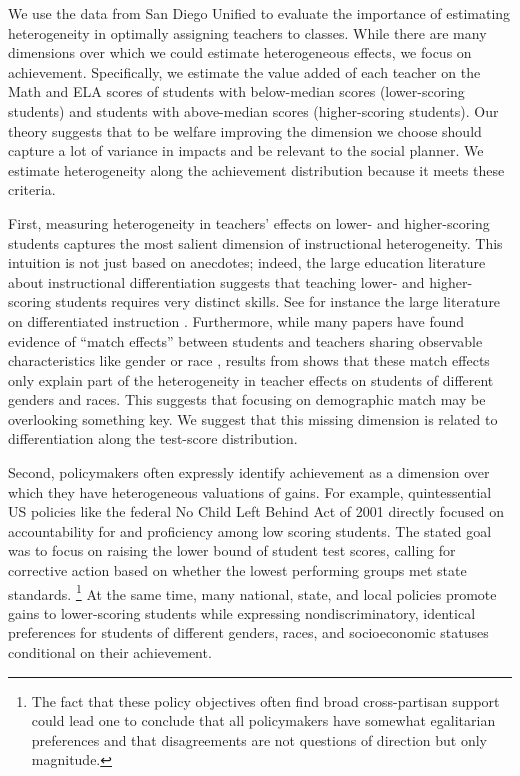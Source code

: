 \documentclass[12pt]{article}
\theoremstyle{definition}
\theoremstyle{definition}
\theoremstyle{definition}
\theoremstyle{definition}
\begin{document}
We use the data from San Diego Unified to evaluate the importance of estimating heterogeneity in optimally assigning teachers to classes. While there are many dimensions over which we could estimate heterogeneous effects, we focus on achievement. Specifically, we estimate the value added of each teacher on the Math and ELA scores of students with below-median scores (lower-scoring students) and students with above-median scores (higher-scoring students). Our theory suggests that to be welfare improving the dimension we choose should capture a lot of variance in impacts and be relevant to the social planner. We estimate heterogeneity along the achievement distribution because it meets these criteria. 

First, measuring heterogeneity in teachers' effects on lower- and higher-scoring students captures the most salient dimension of instructional heterogeneity. This intuition is not just based on anecdotes; indeed, the large education literature about instructional differentiation suggests that teaching lower- and higher-scoring students requires very distinct skills. See for instance the large literature on differentiated instruction \citep[Examples from math include][]{XXXXX JB TO ADD XXXX}. Furthermore, while many papers have found evidence of ``match effects'' between students and teachers sharing  observable characteristics like gender or race \citep{dee2005teacher,delhommer2019highschool}, results from \citet{Delgado2020} shows that these match effects only explain part of the heterogeneity in teacher effects on students of different genders and races. This suggests that focusing on demographic match may be overlooking something key. We suggest that this missing dimension is related to differentiation along the test-score distribution.

Second, policymakers often expressly identify achievement as a dimension over which they have heterogeneous valuations of gains. For example, quintessential US policies like the federal No Child Left Behind Act of 2001 directly focused on accountability for and proficiency among low scoring students. The stated goal was to focus on raising the lower bound of student test scores, calling for corrective action based on whether the lowest performing groups met state standards. \footnote{The fact that these policy objectives often find broad cross-partisan support could lead one to conclude that all policymakers have somewhat egalitarian preferences and that disagreements are not questions of direction but only magnitude.} At the same time, many national, state, and local policies promote gains to lower-scoring students while expressing nondiscriminatory, identical preferences for students of different genders, races, and socioeconomic statuses conditional on their achievement. 
\end{document}
